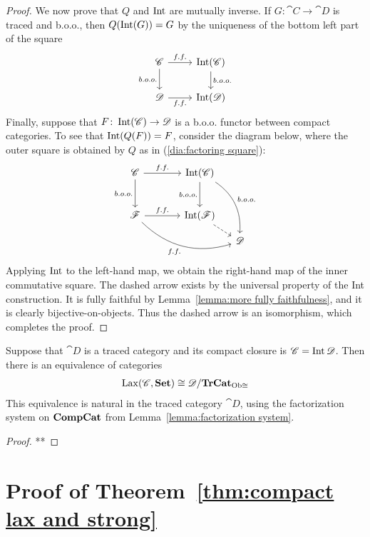 \documentclass[12pt,oneside,article,draft]{memoir}
\begin{document}
\begin{proof}
We now prove that $Q$ and $\operatorname{Int}$ are mutually inverse. If $G\colon\cat{C}\to\cat{D}$ is traced and b.o.o., then $Q(\operatorname{Int}(G))=G$ by the uniqueness of the bottom left part of the square
$$
\begin{tikzcd}
\cat{C}\arrow[r,"f.f."]\arrow[d,"b.o.o."']&\Int(\cat{C})\arrow[d,"b.o.o."]\\
\cat{D}\arrow[r,"f.f."']&\Int(\cat{D})
\end{tikzcd}
$$
Finally, suppose that $F\colon\operatorname{Int}(\mathscr{C})\to\mathscr{D}$ is a b.o.o. functor between compact categories. To see that $\operatorname{Int}(Q(F))=F$, consider the diagram below, where the outer square is obtained by $Q$ as in (\ref{dia:factoring square}):
$$
\begin{tikzcd}[column sep=small, row sep=small]
\cat{C}\arrow[rr,"f.f."]\arrow[dd,"b.o.o."']&~&\Int(\cat{C})\arrow[dd,"b.o.o."']\arrow[dddr,bend left,"b.o.o."]\\~\\
\cat{F}\arrow[rr,"f.f."]\arrow[drrr,bend right, "f.f."']&&\Int(\cat{F})\arrow[dr,dashed]\\
&&&\cat{D}
\end{tikzcd}
$$
Applying $\operatorname{Int}$ to the left-hand map, we obtain the right-hand map of the inner commutative square. The dashed arrow exists by the universal property of the Int construction. It is fully faithful by Lemma~\ref{lemma:more fully faithfulness}, and it is clearly bijective-on-objects. Thus the dashed arrow is an isomorphism, which completes the proof.


\end{proof}


\begin{corollary}
Suppose that $\cat{D}$ is a traced category and its compact closure is $\mathscr{C}=\operatorname{Int}\mathscr{D}$. Then there is an equivalence of categories
\begin{align}\label{dia:traced lax strong}
\operatorname{Lax}(\mathscr{C},\mathbf{Set})\cong\mathscr{D}/\mathbf{TrCat}_{{\operatorname{Ob}\cong}}
\end{align}
This equivalence is natural in the traced category $\cat{D}$, using the factorization system on $\mathbf{CompCat}$ from Lemma~\ref{lemma:factorization system}.
\end{corollary}

\begin{proof}
**
\end{proof}



\chapter{Proof of Theorem~\ref{thm:compact lax and strong}}
\end{document}
